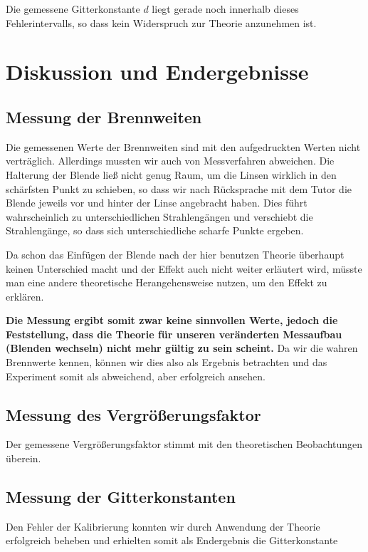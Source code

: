 \documentclass[a4paper,german,12pt,smallheadings]{scrartcl}
\begin{document}
Die gemessene Gitterkonstante $d$ liegt gerade noch innerhalb dieses
Fehlerintervalls, so dass kein Widerspruch zur Theorie anzunehmen ist.

\section{Diskussion und Endergebnisse}

\subsection{Messung der Brennweiten}

Die gemessenen Werte der Brennweiten sind mit den aufgedruckten Werten nicht
verträglich. Allerdings mussten wir auch von Messverfahren abweichen. Die
Halterung der Blende ließ nicht genug Raum, um die Linsen wirklich in den
schärfsten Punkt zu schieben, so dass wir nach Rücksprache mit dem Tutor die
Blende jeweils vor und hinter der Linse angebracht haben. Dies führt
wahrscheinlich zu unterschiedlichen Strahlengängen und verschiebt die
Strahlengänge, so dass sich unterschiedliche scharfe Punkte ergeben.

Da schon das Einfügen der Blende nach der hier benutzen Theorie überhaupt
keinen Unterschied macht und der Effekt auch nicht weiter erläutert wird,
müsste man eine andere theoretische Herangehensweise nutzen, um den Effekt zu
erklären.

\textbf{Die Messung ergibt somit zwar keine sinnvollen Werte, jedoch die
Feststellung, dass die Theorie für unseren veränderten Messaufbau (Blenden
wechseln) nicht mehr gültig zu sein scheint.} Da wir die wahren Brennwerte
kennen, können wir dies also als Ergebnis betrachten und das Experiment somit
als abweichend, aber erfolgreich ansehen.

\subsection{Messung des Vergrößerungsfaktor}

Der gemessene Vergrößerungsfaktor stimmt mit den theoretischen Beobachtungen
überein.

\subsection{Messung der Gitterkonstanten}

Den Fehler der Kalibrierung konnten wir durch Anwendung der Theorie erfolgreich
beheben und erhielten somit als Endergebnis die Gitterkonstante
\end{document}
